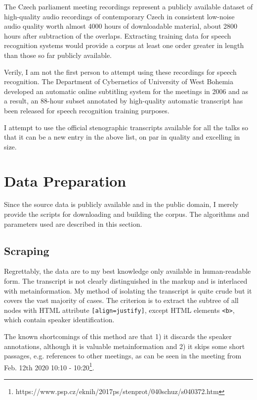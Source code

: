 \documentclass[runningheads]{llncs}
\begin{document}
The Czech parliament meeting recordings represent a publicly available dataset
of high-quality audio recordings of contemporary Czech in consistent low-noise
audio quality worth almost 4000 hours of downloadable material, about 2800 hours
after subtraction of the overlaps. Extracting
training data for speech recognition systems would provide a corpus at least
one order greater in length than those so far publicly available.

Verily, I am not the first person to attempt using these recordings for speech
recognition. The Department of Cybernetics of University of West Bohemia
developed an automatic online subtitling system for the meetings in
2006\cite{pspsubs} and as a result, an 88-hour subset annotated by high-quality
automatic transcript has been released for speech recognition training
purposes\cite{pspdata}.

I attempt to use the official stenographic transcripts available for all the
talks so that it can be a new entry in the above list, on par in quality and
excelling in size.

\section{Data Preparation}

Since the source data is publicly available and in the public domain, I merely
provide the scripts for downloading and building the corpus. The algorithms and
parameters used are described in this section.

\subsection{Scraping}

Regrettably, the data are to my best knowledge only available in human-readable
form. The transcript is not clearly distinguished in the markup and is
interlaced with metainformation. My method of isolating the transcript is quite
crude but it covers the vast majority of cases. The criterion is to extract the
subtree of all nodes with HTML attribute \texttt{[align=justify]}, except HTML
elements \texttt{<b>}, which contain speaker identification.

The known shortcomings of this method are that 1) it discards the speaker
annotations, although it is valuable metainformation and 2) it skips some short
passages, e.g. references to other meetings, as can be seen in the meeting
from Feb. 12th 2020 10:10 -
10:20\footnote{https://www.psp.cz/eknih/2017ps/stenprot/040schuz/s040372.htm}.
\end{document}
